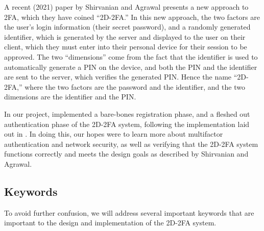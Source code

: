 \documentclass[11pt]{article}
\begin{document}
A recent (2021) paper \cite{shirvanian2d2fa} by Shirvanian and Agrawal
presents a new approach to 2FA, which they have coined ``2D-2FA.'' In
this new approach, the two factors are the user's login information
(their secret password), and a randomly generated identifier, which is
generated by the server and displayed to the user on their client, which
they must enter into their personal device for their session to be
approved. The two ``dimensions'' come from the fact that the identifier
is used to automatically generate a PIN on the device, and both the PIN
and the identifier are sent to the server, which verifies the generated
PIN. Hence the name ``2D-2FA,'' where the two factors are the password
and the identifier, and the two dimensions are the identifier and the
PIN. 

In our project, implemented a bare-bones registration phase, and a
fleshed out authentication phase of the 2D-2FA system, following the
implementation laid out in \cite{shirvanian2d2fa}. In doing this, our
hopes were to learn more about multifactor authentication and network
security, as well as verifying that the 2D-2FA system functions
correctly and meets the design goals as described by Shirvanian and
Agrawal. 



\subsection{Keywords}

To avoid further confusion, we will address several important keywords
that are important to the design and implementation of the 2D-2FA
system. 

\end{document}
